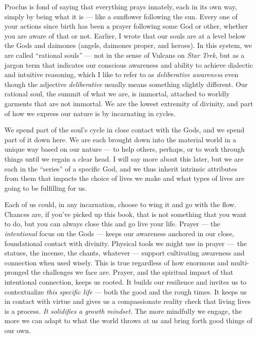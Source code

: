 \documentclass[
]{book}
\begin{document}
Proclus is fond of saying that everything prays innately, each in its own way, simply by being what it is --- like a sunflower following the sun. Every one of your actions since birth has been a prayer following some God or other, whether you are aware of that or not. Earlier, I wrote that our souls are at a level below the Gods and daimones (angels, daimones proper, and heroes). In this system, we are called ``rational souls'' --- not in the sense of Vulcans on \emph{Star Trek}, but as a jargon term that indicates our conscious awareness and ability to achieve dialectic and intuitive reasoning, which I like to refer to as \emph{deliberative awareness} even though the adjective \emph{deliberative} usually means something slightly different. Our rational soul, the summit of what we are, is immortal, attached to worldly garments that are not immortal. We are the lowest extremity of divinity, and part of how we express our nature is by incarnating in cycles.

We spend part of the soul's cycle in close contact with the Gods, and we spend part of it down here. We are each brought down into the material world in a unique way based on our nature --- to help others, perhaps, or to work through things until we regain a clear head. I will say more about this later, but we are each in the ``series'' of a specific God, and we thus inherit intrinsic attributes from them that impacts the choice of lives we make and what types of lives are going to be fulfilling for us.

Each of us could, in any incarnation, choose to wing it and go with the flow. Chances are, if you've picked up this book, that is not something that you want to do, but you can always close this and go live your life. Prayer --- the \emph{intentional} focus on the Gods --- keeps our awareness anchored in our close, foundational contact with divinity. Physical tools we might use in prayer ---~the statues, the incense, the chants, whatever --- support cultivating awareness and connection when used wisely. This is true regardless of how enormous and multi-pronged the challenges we face are. Prayer, and the spiritual impact of that intentional connection, keeps us rooted. It builds our resilience and invites us to contextualize \emph{this specific life} --- both the good and the rough times. It keeps us in contact with virtue and gives us a compassionate reality check that living lives is a process. \emph{It solidifies a growth mindset.} The more mindfully we engage, the more we can adapt to what the world throws at us and bring forth good things of our own.
\end{document}

